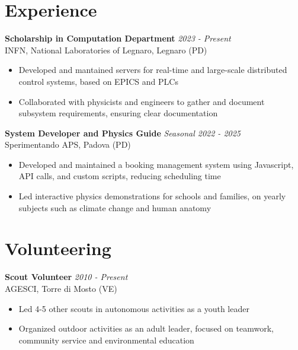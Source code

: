 \documentclass[a4paper,10pt]{article}
\begin{document}
\begin{minipage}[t]{0.58\textwidth}
    \section*{Experience}
        \textbf{Scholarship in Computation Department}  \hfill \textit{2023 - Present} \\
        INFN, National Laboratories of Legnaro, Legnaro (PD)
        \vspace{-0.1cm}
        \begin{itemize}[left=0.2cm, label={\textbullet}, itemsep=0cm]
            \item Developed and mantained servers for real-time and large-scale distributed control systems, based on EPICS and PLCs
            \item Collaborated with physicists and engineers to gather and document subsystem requirements, ensuring clear documentation
        \end{itemize}
        \vspace{0.2cm}
        
        \textbf{System Developer and Physics Guide}  \hfill \textit{Seasonal 2022 - 2025} \\
        Sperimentando APS, Padova (PD)
        \vspace{-0.1cm}
        \begin{itemize}[left=0.2cm, label={\textbullet}, itemsep=0cm]
            \item Developed and maintained a booking management system using Javascript, API calls, and custom scripts, reducing scheduling time
            \item Led interactive physics demonstrations for schools and families, on yearly subjects such as climate change and human anatomy
        \end{itemize}

    \section*{Volunteering}
        \textbf{Scout Volunteer} \hfill \textit{2010 - Present} \\
        AGESCI, Torre di Mosto (VE)
        \vspace{-0.1cm}
        \begin{itemize}[left=0.2cm, label={\textbullet}, itemsep=0cm]
            \item Led 4-5 other scouts in autonomous activities as a youth leader
            \item Organized outdoor activities as an adult leader, focused on teamwork, community service and environmental education
        \end{itemize}
\end{minipage}

\vfill
\vfill
\end{document}
